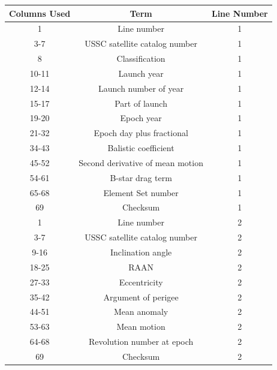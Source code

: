 \documentclass[12pt]{report}
\begin{document}
\begin{center}
    \begin{tabular}{|c|c|c|}
        \hline
        Columns Used & Term & Line Number \\
        \hline
        1 & Line number & 1 \\
        \hline
        3-7 & USSC satellite catalog number & 1 \\
        \hline
        8 & Classification & 1 \\
        \hline
        10-11 & Launch year & 1\\
        \hline
        12-14 & Launch number of year & 1 \\
        \hline
        15-17 & Part of launch & 1 \\
        \hline 
        19-20 & Epoch year & 1 \\
        \hline
        21-32 & Epoch day plus fractional & 1 \\
        \hline
        34-43 & Balistic coefficient & 1 \\
        \hline
        45-52 & Second derivative of mean motion & 1 \\
        \hline
        54-61 & B-star drag term & 1 \\
        \hline
        65-68 & Element Set number & 1 \\
        \hline
        69 & Checksum & 1 \\
        \hline\hline
        1 & Line number & 2 \\
        \hline
        3-7 & USSC satellite catalog number & 2 \\
        \hline
        9-16 & Inclination angle & 2 \\
        \hline
        18-25 & RAAN & 2 \\
        \hline
        27-33 & Eccentricity & 2 \\
        \hline
        35-42 & Argument of perigee & 2 \\
        \hline
        44-51 & Mean anomaly & 2 \\
        \hline
        53-63 & Mean motion & 2 \\
        \hline
        64-68 & Revolution number at epoch & 2 \\
        \hline
        69 & Checksum & 2 \\
        \hline\hline
        
    \end{tabular}

\end{center}
\end{document}
